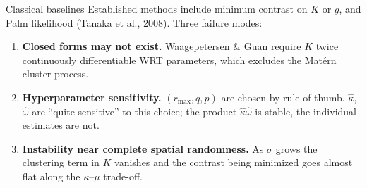 \documentclass[aspectratio=169,10pt]{beamer}
\begin{document}
\begin{frame}{Classical baselines}
Established methods include minimum contrast on $K$ or $g$, and Palm likelihood
(Tanaka et al., 2008). Three failure modes:
\vspace{8pt}
\begin{enumerate}\setlength\itemsep{8pt}
  \item \textbf{Closed forms may not exist.}
        Waagepetersen \& Guan require $K$ twice continuously
        differentiable WRT parameters, which excludes the Mat\'ern cluster process.
  \item \textbf{Hyperparameter sensitivity.}
        $(r_{\max}, q, p)$ are chosen by rule of thumb.
        $\hat\kappa$, $\hat\omega$ are ``quite sensitive'' to this
        choice; the product $\hat\kappa\hat\omega$ is stable, the individual
        estimates are not.
  \item \textbf{Instability near complete spatial randomness.}
        As $\sigma$ grows the clustering term in $K$ vanishes and the contrast
        being minimized goes almost flat along the $\kappa$--$\mu$ trade-off.
\end{enumerate}
\end{frame}
\end{document}

